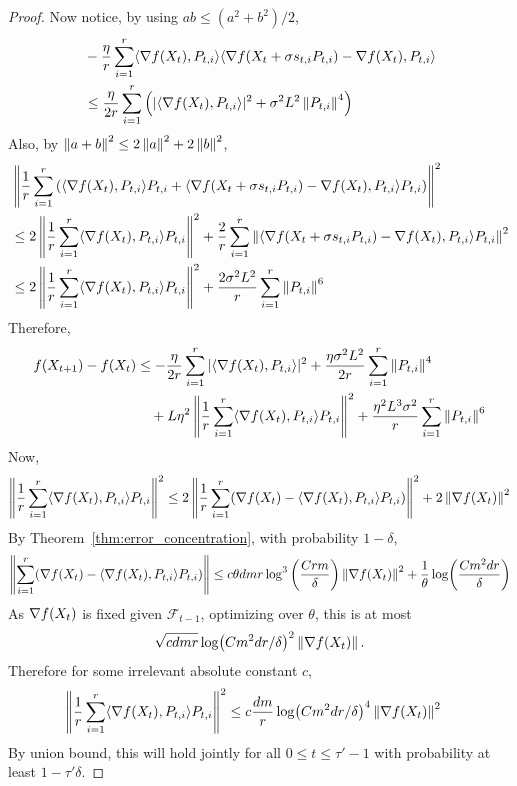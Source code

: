 \begin{proof}
Now notice, by using $ab \leq (a^2+b^2)/2$,
\begin{align*}
    &- \frac{\eta}{r} \sum_{i=1}^r \langle \nabla f(X_t), P_{t,i} \rangle \langle \nabla f(X_t + \sigma s_{t,i} P_{t,i}) - \nabla f(X_t), P_{t,i} \rangle
    \\&\leq \frac{\eta}{2r} \sum_{i=1}^r \left(|\langle \nabla f(X_t ), P_{t,i} \rangle|^2 + \sigma^2 L^2 \left\lVert P_{t,i} \right\rVert^4 \right)
\end{align*}
Also, by $\left\lVert a+b \right\rVert^2 \leq 2\left\lVert a \right\rVert^2 + 2\left\lVert b \right\rVert^2$,
\begin{align*}
    &\left \|\frac 1r \sum_{i=1}^r \left(\langle \nabla f(X_t), P_{t,i} \rangle P_{t,i} + \langle \nabla f(X_t+\sigma s_{t,i} P_{t,i}) - \nabla f(X_t), P_{t,i} \rangle P_{t,i} \right) \right \|^2
    \\&\leq 2\left\|\frac 1r \sum_{i=1}^r \langle \nabla f(X_t), P_{t,i} \rangle P_{t,i} \right\|^2 + \frac{2}{r} \sum_{i=1}^r \left \| \langle \nabla f(X_t+\sigma s_{t,i} P_{t,i}) - \nabla f(X_t), P_{t,i} \rangle P_{t,i} \right \|^2 \\
    &\leq 2\left\|\frac 1r \sum_{i=1}^r \langle \nabla f(X_t), P_{t,i} \rangle P_{t,i} \right\|^2 + \frac{2\sigma^2 L^2}{r} \sum_{i=1}^r \left\lVert P_{t,i} \right\rVert^6
\end{align*}
Therefore,
\begin{align*}
    f(X_{t+1}) - f(X_t) &\leq -\frac{\eta}{2r} \sum_{i=1}^r |\langle \nabla f(X_t), P_{t,i} \rangle|^2 + \frac{\eta \sigma^2 L^2}{2r} \sum_{i=1}^r \left\lVert P_{t,i} \right\rVert^4 \\
    &\quad + L\eta^2 \left \| \frac{1}{r} \sum_{i=1}^r  \langle \nabla f(X_t), P_{t,i} \rangle P_{t,i} \right\|^2 + \frac{\eta^2 L^3 \sigma^2}{r} \sum_{i=1}^r \left\lVert P_{t,i} \right\rVert^6
\end{align*}
Now,
\begin{align*}
    \left \| \frac{1}{r} \sum_{i=1}^r  \langle \nabla f(X_t), P_{t,i} \rangle P_{t,i} \right\|^2 \leq 2\left \| \frac{1}{r} \sum_{i=1}^r  (\nabla f(X_t) - \langle \nabla f(X_t), P_{t,i} \rangle P_{t,i}) \right\|^2 + 2\left\lVert \nabla f(X_t) \right\rVert^2
\end{align*}
By Theorem~\ref{thm:error_concentration}, with probability $1-\delta$,
\begin{align*}
    \left \|\sum_{i=1}^r  (\nabla f(X_t) - \langle \nabla f(X_t), P_{t,i} \rangle P_{t,i}) \right\| \leq c \theta dmr \log^3 \qty(\frac{C r m}{\delta}) \left\lVert \nabla f(X_t) \right\rVert^2 + \frac{1}{\theta} \log(\frac{Cm^2 dr}{\delta})
\end{align*}
As $\nabla f(X_t)$ is fixed given $\mathcal F_{t-1}$, optimizing over $\theta$, this is at most
\begin{align*}
    \sqrt{cdmr} \log(Cm^2dr/\delta)^2 \left\lVert \nabla f(X_t) \right\rVert.
\end{align*}
Therefore for some irrelevant absolute constant $c$,
\begin{align}\label{eq:error_equation}
    \left \| \frac{1}{r} \sum_{i=1}^r  \langle \nabla f(X_t), P_{t,i} \rangle P_{t,i} \right\|^2 &\leq c \frac{dm}{r} \log(Cm^2dr/\delta)^4 \left\lVert \nabla f(X_t) \right\rVert^2
\end{align}
By union bound, this will hold jointly for all $0 \leq t \leq \tau'-1$ with probability at least $1-\tau' \delta$.


\end{proof}
